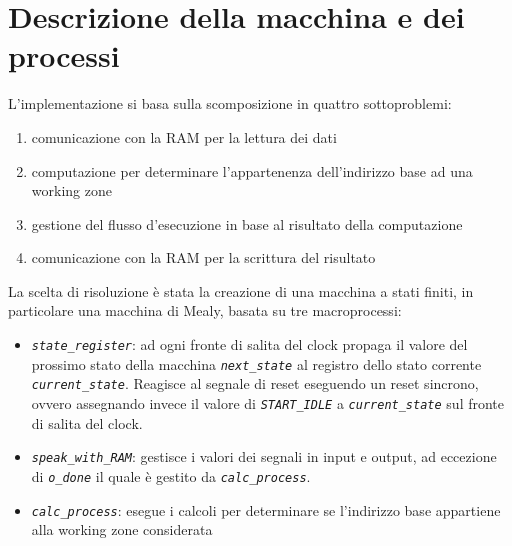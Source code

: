 \documentclass[12pt,a4paper,titlepage]{article}
\begin{document}
	\section{Descrizione della macchina e dei processi}
		L'implementazione si basa sulla scomposizione in quattro sottoproblemi:
		\begin{enumerate}
			\item comunicazione con la RAM per la lettura dei dati
			\item computazione per determinare l'appartenenza dell'indirizzo base ad una working zone
			\item gestione del flusso d'esecuzione in base al risultato della computazione
			\item comunicazione con la RAM per la scrittura del risultato
		\end{enumerate}
		La scelta di risoluzione è stata la creazione di una macchina a stati finiti, in particolare una macchina di Mealy, basata su tre macroprocessi:
		\begin{itemize}
			\item \textit{\texttt{state\_register}}: ad ogni fronte di salita del clock propaga il valore del prossimo stato della macchina \textit{\texttt{next\_state}} al registro dello stato corrente \textit{\texttt{current\_state}}. Reagisce al segnale di reset eseguendo un reset sincrono, ovvero assegnando invece il valore di \textit{\texttt{START\_IDLE}} a \textit{\texttt{current\_state}} sul fronte di salita del clock.
			
			\item \textit{\texttt{speak\_with\_RAM}}: gestisce i valori dei segnali in input e output, ad eccezione di \textit{\texttt{o\_done}} il quale è gestito da \textit{\texttt{calc\_process}}.
			
			\item \textit{\texttt{calc\_process}}: esegue i calcoli per determinare se l'indirizzo base appartiene alla working zone considerata
		\end{itemize}
		
\end{document}
